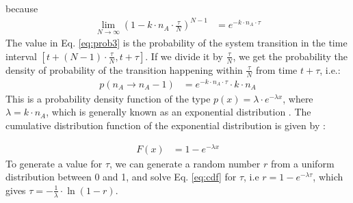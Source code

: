 \documentclass[12pt]{article}
\begin{document}
because 
\begin{align}
\lim_{N \to \infty} (1-k \cdot n_A \cdot \frac {\tau} {N})^{N-1} &= e^{-k \cdot n_A \cdot \tau}
\label{eq:limit}
\end{align}
The value in Eq. \ref{eq:prob3} is the probability of the system transition in the time interval $[t+(N-1) \cdot \frac \tau N,t+\tau]$. If we divide it by $\frac\tau N$, we get the probability the density of probability of the transition happening within $\frac \tau N$ from time $t+\tau$, i.e.:
\begin{align}
p(n_A \rightarrow n_A-1) &= e^{-k \cdot n_A \cdot \tau} \cdot k \cdot n_A  
\label{eq:prob4}
\end{align}
This is a probability density function of the type $p(x) = \lambda \cdot e^{-\lambda x}$, where $\lambda = k \cdot n_A$, which is generally known as an exponential distribution \cite{introProb2005}. The cumulative distribution function of the exponential distribution is given by \cite{introProb2005}:

\begin{align}
F(x) &= 1-e^{-\lambda x}
\label{eq:cdf}
\end{align}
To generate a value for $\tau$, we can generate a random number $r$ from a uniform distribution between 0 and 1, and solve Eq. \ref{eq:cdf} for $\tau$, i.e $r = 1-e^{-\lambda \tau}$, which gives $\tau = -\frac 1 \lambda \cdot \ln(1-r)$. 
\end{document}
